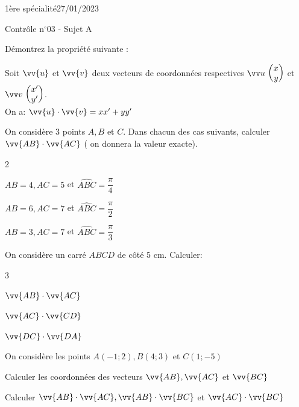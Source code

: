 \documentclass[a4paper,12pt]{article}        %
\begin{document}
\graphicspath{{../images/}}
\pagestyle{empty}
\vspace*{-1.5cm}
1ère spécialité\phantom{xxxxxxxxxxxxxxxxxxxxxxxxxxxxxxxxxxxxxxxxxxxxxxxxxxxxxxxxxxxxxxx}27/01/2023
{\begin{center}\Huge{Contrôle n$^{\circ}$03 - Sujet A}\end{center}}


Démontrez la propriété suivante :
\begin{propriete}
	Soit $\vv{u}$ et $\vv{v}$ deux vecteurs de coordonnées respectives $\Coord{u}{x}{y}$ et $\Coord{v}{x'}{y'}$.\\
	On a: $\vv{u} \cdot \vv{v}=x x^{\prime}+y y^{\prime}$
\end{propriete}


On considère 3 points $A, B$ et $C$. Dans chacun des cas suivants, calculer $\vv{A B} \cdot \vv{A C}$ ( on donnera la valeur exacte).
\begin{multicols}{2}
	\begin{enumMet}
		\item $A B=4, A C=5$ et $\widehat{A B C}=\dfrac{\pi}{4}$
		\item $A B=6, A C=7$ et $\widehat{A B C}=\dfrac{\pi}{2}$
		\item $A B=3, A C=7$ et $\widehat{A B C}=\dfrac{\pi}{3}$
	\end{enumMet}
\end{multicols}

\vspace{-0.3cm}
On considère un carré $A B C D$ de côté 5 cm. Calculer:
\begin{multicols}{3}
	\begin{enumMet}
		\item $\vv{A B} \cdot \vv{A C}$
		\item $\vv{AC} \cdot \vv{C D}$
		\item $\vv{D C} \cdot \vv{D A}$
	\end{enumMet}
\end{multicols}

\vspace{-0.3cm}
On considère les points $A(-1 ; 2), B(4 ; 3)$ et $C(1 ;-5)$
\begin{enumMet}
	\item Calculer les coordonnées des vecteurs $\vv{A B}, \vv{A C}$ et $\vv{B C}$
	\item Calculer $\vv{A B} \cdot \vv{A C}, \vv{A B} \cdot \vv{B C}$ et $\vv{A C} \cdot \vv{B C}$
\end{enumMet}
\end{document}
